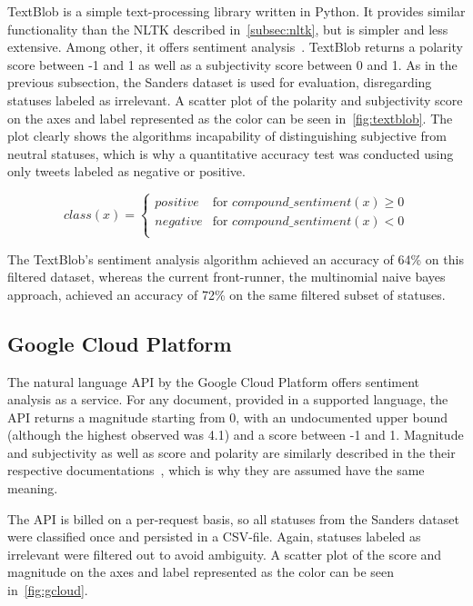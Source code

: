 TextBlob is a simple text-processing library written in Python.
It provides similar functionality than the NLTK described in~\cref{subsec:nltk},
but is simpler and less extensive.
Among other, it offers sentiment analysis~\cite{textblobDocs}.
TextBlob returns a polarity score between -1 and 1 as well as a subjectivity score between 0 and 1.
As in the previous subsection, the Sanders dataset is used for evaluation, disregarding statuses labeled as irrelevant.
A scatter plot of the polarity and subjectivity score on the axes and label represented as the color can be seen in~\cref{fig:textblob}.
The plot clearly shows the algorithms incapability of distinguishing subjective from neutral statuses,
which is why a quantitative accuracy test was conducted using only tweets labeled as negative or positive.

\begin{equation}
    class(x) =
    \begin{cases}
        positive & \text{for } compound\_sentiment(x) \geq 0 \\
        negative & \text{for } compound\_sentiment(x) < 0\\
    \end{cases}
\end{equation}

The TextBlob's sentiment analysis algorithm achieved an accuracy of 64\% on this filtered dataset,
whereas the current front-runner, the multinomial naive bayes approach,
achieved an accuracy of 72\% on the same filtered subset of statuses.

\subsection{Google Cloud Platform}
\label{subsec:googlecloud}

The natural language API by the Google Cloud Platform offers sentiment analysis as a service.
For any document, provided in a supported language, the API returns a magnitude starting from 0, with an undocumented upper bound
(although the highest observed was 4.1) and a score between -1 and 1.
Magnitude and subjectivity as well as score and polarity are similarly described in the their respective documentations~\cite{gcloudDocs}\cite{textblobDocs},
which is why they are assumed have the same meaning.

The API is billed on a per-request basis, so all statuses from the Sanders dataset were classified once and persisted in a CSV-file.
Again, statuses labeled as irrelevant were filtered out to avoid ambiguity.
A scatter plot of the score and magnitude on the axes and label represented as the color can be seen in~\cref{fig:gcloud}.

